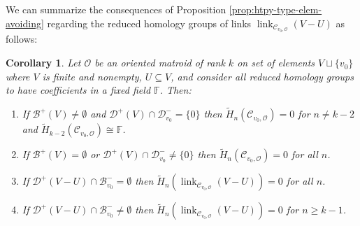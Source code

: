 \documentclass[a4paper,11pt,reqno, english]{amsart}
\newtheorem{corollary}[theorem]{Corollary}
\theoremstyle{definition}
\theoremstyle{remark}
\DeclareMathOperator{\link}{\mathrm{link}}
\begin{document}
We can summarize the consequences of Proposition \ref{prop:htpy-type-elem-avoiding} regarding the reduced homology groups of links $\link_{\mathscr{C}_{v_0,\mathscr{O}}}(V-U)$ as follows:
\begin{corollary}\label{crl:homology-of-elem-avoiding}
    Let $\mathscr{O}$ be an oriented matroid of rank $k$ on set of elements $V\sqcup\{v_0\}$ where $V$ is finite and nonempty, $U\subseteq V$, and consider all reduced homology groups to have coefficients in a fixed field $\mathbb{F}$. Then:
    \begin{enumerate}[label=\normalfont{(\arabic*)}]
        \item\label{crl:homology-of-elem-avoiding:sphere} If $\mathscr{B}^+(V)\neq\emptyset$ and $\mathscr{D}^+(V)\cap\mathscr{D}^-_{v_0}=\{0\}$ then $\tilde{H}_n(\mathscr{C}_{v_0,\mathscr{O}})=0$ for $n\neq k-2$ and $\tilde{H}_{k-2}(\mathscr{C}_{v_0,\mathscr{O}})\cong\mathbb{F}$.
        \item\label{crl:homology-of-elem-avoiding:entire-contr} If $\mathscr{B}^+(V)=\emptyset$ or $\mathscr{D}^+(V)\cap\mathscr{D}^-_{v_0}\neq\{0\}$ then $\tilde{H}_n(\mathscr{C}_{v_0,\mathscr{O}})=0$ for all $n$.
        \item\label{crl:homology-of-elem-avoiding:void} If $\mathscr{D}^+(V-U)\cap\mathscr{B}^-_{v_0}=\emptyset$ then $\tilde{H}_n(\link_{\mathscr{C}_{v_0,\mathscr{O}}}(V-U))=0$ for all $n$.
        \item\label{crl:homology-of-elem-avoiding:rest} If $\mathscr{D}^+(V-U)\cap\mathscr{B}^-_{v_0}\neq\emptyset$ then $\tilde{H}_n(\link_{\mathscr{C}_{v_0,\mathscr{O}}}(V-U))=0$ for $n\geq k-1$.
    \end{enumerate}
\end{corollary}
\end{document}
